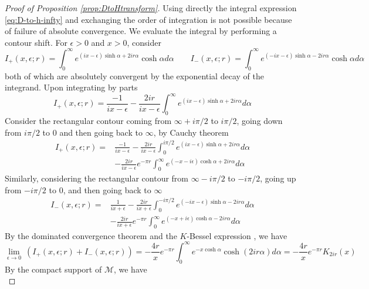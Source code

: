 \documentclass{article}
\numberwithin{equation}{section}
\begin{document}
\begin{proof}[Proof of Proposition \ref{prop:DtoHtransform}] Using directly the integral expression \eqref{eq:D-to-h-infty} and exchanging the order of integration is not possible because of failure of absolute convergence. We evaluate the integral by performing a contour shift.
    For $\epsilon>0$ and $x>0$, consider 
    $$ I_+(x,\epsilon;r)  =\int_{0}^{\infty}e^{(ix-\epsilon)\sinh\alpha+2ir\alpha}\cosh\alpha d\alpha \qquad I_-(x,\epsilon;r)  =\int_{0}^{\infty}e^{(-ix-\epsilon)\sinh\alpha-2ir\alpha}\cosh\alpha d\alpha$$
    both of which are absolutely convergent by the exponential decay of the integrand. Upon integrating by parts
    $$I_+(x,\epsilon;r)=\frac{-1}{ix-\epsilon}-\frac{2ir}{ix-\epsilon}\int_{0}^{\infty}e^{(ix-\epsilon)\sinh\alpha+2ir\alpha}d\alpha$$
    Consider the rectangular contour coming from $\infty+i\pi/2$ to $i\pi/2$, going down from $i\pi/2$ to $0$ and then going back to $\infty$, by Cauchy theorem
    \begin{equation}\label{eq:bigIplus}
    \begin{split}
        I_+(x,\epsilon;r) = & \frac{-1}{ix-\epsilon}-\frac{2ir}{ix-\epsilon}\int_{0}^{i\pi/2}e^{(ix-\epsilon)\sinh\alpha+2ir\alpha}d\alpha \\
        &-\frac{2ir}{ix-\epsilon}e^{-\pi r}\int_{0}^{\infty}e^{(-x-i\epsilon)\cosh\alpha+2ir\alpha}d\alpha
    \end{split}    
    \end{equation}
    Similarly, considering the rectangular contour from $\infty-i\pi/2$ to $-i\pi/2$, going up from $-i\pi/2$ to $0$, and then going back to $\infty$
    \begin{equation}\label{eq:bigIminus}
        \begin{split}
        I_-(x,\epsilon;r) = &  \frac{1}{ix+\epsilon}-\frac{2ir}{ix+\epsilon}\int_{0}^{-i\pi/2}e^{(-ix-\epsilon)\sinh\alpha-2ir\alpha}d\alpha \\
        & -\frac{2ir}{ix+\epsilon}e^{-\pi r}\int_{0}^{\infty}e^{(-x+i\epsilon)\cosh\alpha-2ir\alpha}d\alpha
        \end{split}
    \end{equation}
    By the dominated convergence theorem and the $K$-Bessel expression  \cite[(8.432.1)]{Gradshteyn}, we have 
    $$\lim_{\epsilon \to 0} \ (I_+(x,\epsilon;r)+I_-(x,\epsilon;r))=-\frac{4r}{x}e^{-\pi r}\int_{0}^{\infty}e^{-x\cosh\alpha}\cosh(2ir\alpha)d\alpha=-\frac{4r}{x}e^{-\pi r}K_{2ir}(x)$$
    By the compact support of $\mathcal{M}$, we have
    \begin{equation*}

\end{equation*}
\end{proof}
\end{document}
